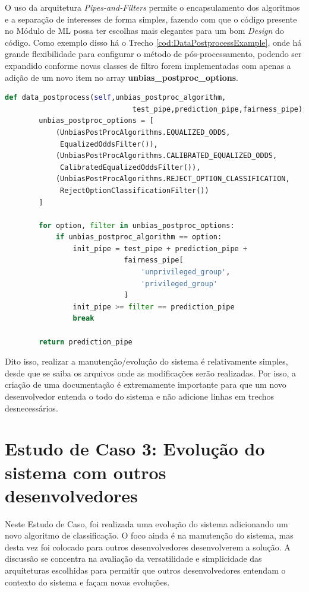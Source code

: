 \documentclass[Portugues,Final]{ic-tese-v3}
\begin{document}
O uso da arquitetura \textit{Pipes-and-Filters} permite o encapsulamento dos algoritmos e a separação de interesses de forma simples, fazendo com que o código presente no Módulo de ML possa ter escolhas mais elegantes para um bom \textit{Design} do código. Como exemplo disso há o Trecho \ref{cod:DataPostprocessExample}, onde há grande flexibilidade para configurar o método de pós-processamento, podendo ser expandido conforme novas classes de filtro forem implementadas com apenas a adição de um novo item no array \textbf{unbias\_postproc\_options}.

\begin{lstlisting}[language=Python, caption=Método para seleção de algoritmo para redução de viés de pós-processamento,label=cod:DataPostprocessExample]
    def data_postprocess(self,unbias_postproc_algorithm,
    						  test_pipe,prediction_pipe,fairness_pipe):
        unbias_postproc_options = [
            (UnbiasPostProcAlgorithms.EQUALIZED_ODDS,
             EqualizedOddsFilter()),
            (UnbiasPostProcAlgorithms.CALIBRATED_EQUALIZED_ODDS,
             CalibratedEqualizedOddsFilter()),
            (UnbiasPostProcAlgorithms.REJECT_OPTION_CLASSIFICATION,
             RejectOptionClassificationFilter())
        ]

        for option, filter in unbias_postproc_options:
            if unbias_postproc_algorithm == option:
                init_pipe = test_pipe + prediction_pipe +
                			fairness_pipe[
    	            			'unprivileged_group',
	                			'privileged_group'
                			]
                init_pipe >= filter == prediction_pipe
                break

        return prediction_pipe
\end{lstlisting}

Dito isso, realizar a manutenção/evolução do sistema é relativamente simples, desde que se saiba os arquivos onde as modificações serão realizadas. Por isso, a criação de uma documentação é extremamente importante para que um novo desenvolvedor entenda o todo do sistema e não adicione linhas em trechos desnecessários.

\chapter{Estudo de Caso 3: Evolução do sistema com outros desenvolvedores}

Neste Estudo de Caso, foi realizada uma evolução do sistema adicionando um novo algoritmo de classificação. O foco ainda é na manutenção do sistema, mas desta vez foi colocado para outros desenvolvedores desenvolverem a solução. A discussão se concentra na avaliação da versatilidade e simplicidade das arquiteturas escolhidas para permitir que outros desenvolvedores entendam o contexto do sistema e façam novas evoluções.
\end{document}
